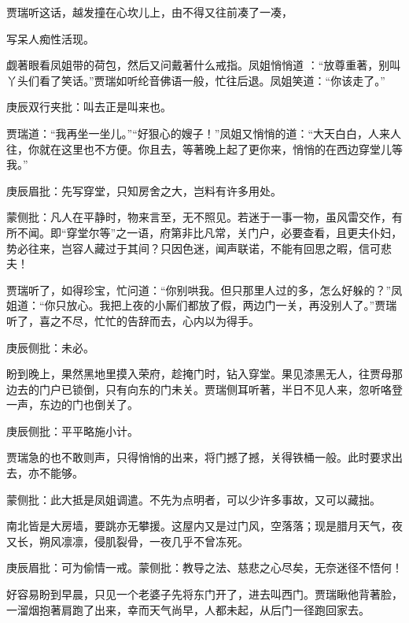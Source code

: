 \begin{parag}


    贾瑞听这话，越发撞在心坎儿上，由不得又往前凑了一凑，\begin{note}写呆人痴性活现。\end{note}觑著眼看凤姐带的荷包，然后又问戴著什么戒指。凤姐悄悄道 ：“放尊重著，别叫丫头们看了笑话。”贾瑞如听纶音佛语一般，忙往后退。凤姐笑道：“你该走了。”\begin{note}庚辰双行夹批：叫去正是叫来也。\end{note}贾瑞道：“我再坐一坐儿。”“好狠心的嫂子！”凤姐又悄悄的道：“大天白白，人来人往，你就在这里也不方便。你且去，等著晚上起了更你来，悄悄的在西边穿堂儿等我。”\begin{note}庚辰眉批：先写穿堂，只知房舍之大，岂料有许多用处。\end{note}\begin{note}蒙侧批：凡人在平静时，物来言至，无不照见。若迷于一事一物，虽风雷交作，有所不闻。即“穿堂尔等”之一语，府第非比凡常，关门户，必要查看，且更夫仆妇，势必往来，岂容人藏过于其间？只因色迷，闻声联诺，不能有回思之暇，信可悲夫！\end{note}贾瑞听了，如得珍宝，忙问道：“你别哄我。但只那里人过的多，怎么好躲的？”凤姐道：“你只放心。我把上夜的小厮们都放了假，两边门一关，再没别人了。”贾瑞听了，喜之不尽，忙忙的告辞而去，心内以为得手。\begin{note}庚辰侧批：未必。\end{note}
\end{parag}


\begin{parag}


    盼到晚上，果然黑地里摸入荣府，趁掩门时，钻入穿堂。果见漆黑无人，往贾母那边去的门户已锁倒，只有向东的门未关。贾瑞侧耳听著，半日不见人来，忽听咯登一声，东边的门也倒关了。\begin{note}庚辰侧批：平平略施小计。\end{note}贾瑞急的也不敢则声，只得悄悄的出来，将门撼了撼，关得铁桶一般。此时要求出去，亦不能够。\begin{note}蒙侧批：此大抵是凤姐调遣。不先为点明者，可以少许多事故，又可以藏拙。\end{note}南北皆是大房墙，要跳亦无攀援。这屋内又是过门风，空落落；现是腊月天气，夜又长，朔风凛凛，侵肌裂骨，一夜几乎不曾冻死。\begin{note}庚辰眉批：可为偷情一戒。蒙侧批：教导之法、慈悲之心尽矣，无奈迷径不悟何！\end{note}好容易盼到早晨，只见一个老婆子先将东门开了，进去叫西门。贾瑞瞅他背著脸，一溜烟抱著肩跑了出来，幸而天气尚早，人都未起，从后门一径跑回家去。
\end{parag}


